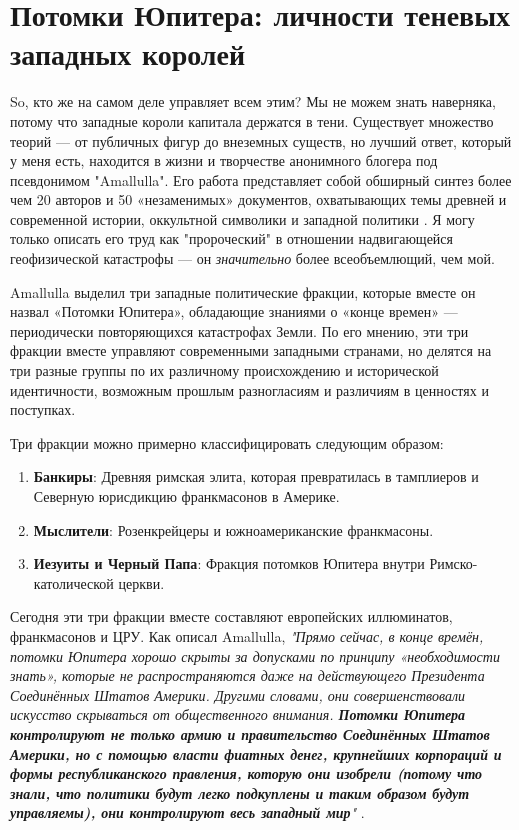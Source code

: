 \documentclass[10pt,twocolumn,letterpaper]{article}
\begin{document}
\section{Потомки Юпитера: личности теневых западных королей}
So, кто же на самом деле управляет всем этим? Мы не можем знать наверняка, потому что западные короли капитала держатся в тени. Существует множество теорий — от публичных фигур до внеземных существ, но лучший ответ, который у меня есть, находится в жизни и творчестве анонимного блогера под псевдонимом "Amallulla". Его работа представляет собой обширный синтез более чем 20 авторов и 50 «незаменимых» документов, охватывающих темы древней и современной истории, оккультной символики и западной политики \cite{33,34}. Я могу только описать его труд как "пророческий" в отношении надвигающейся геофизической катастрофы — он \textit{значительно} более всеобъемлющий, чем мой.

Amallulla выделил три западные политические фракции, которые вместе он назвал «Потомки Юпитера», обладающие знаниями о «конце времен» — периодически повторяющихся катастрофах Земли. По его мнению, эти три фракции вместе управляют современными западными странами, но делятся на три разные группы по их различному происхождению и исторической идентичности, возможным прошлым разногласиям и различиям в ценностях и поступках.

Три фракции можно примерно классифицировать следующим образом:

\begin{flushleft}
\begin{enumerate}
    \item \textbf{Банкиры}: Древняя римская элита, которая превратилась в тамплиеров и Северную юрисдикцию франкмасонов в Америке.
    \item \textbf{Мыслители}: Розенкрейцеры и южноамериканские франкмасоны.
    \item \textbf{Иезуиты и Черный Папа}: Фракция потомков Юпитера внутри Римско-католической церкви.
\end{enumerate}
\end{flushleft}

Сегодня эти три фракции вместе составляют европейских иллюминатов, франкмасонов и ЦРУ. Как описал Amallulla, \textit{"Прямо сейчас, в конце времён, потомки Юпитера хорошо скрыты за допусками по принципу «необходимости знать», которые не распространяются даже на действующего Президента Соединённых Штатов Америки. Другими словами, они совершенствовали искусство скрываться от общественного внимания. \textbf{Потомки Юпитера контролируют не только армию и правительство Соединённых Штатов Америки, но с помощью власти фиатных денег, крупнейших корпораций и формы республиканского правления, которую они изобрели (потому что знали, что политики будут легко подкуплены и таким образом будут управляемы), они контролируют весь западный мир}"} \cite{33,34}.
\end{document}
